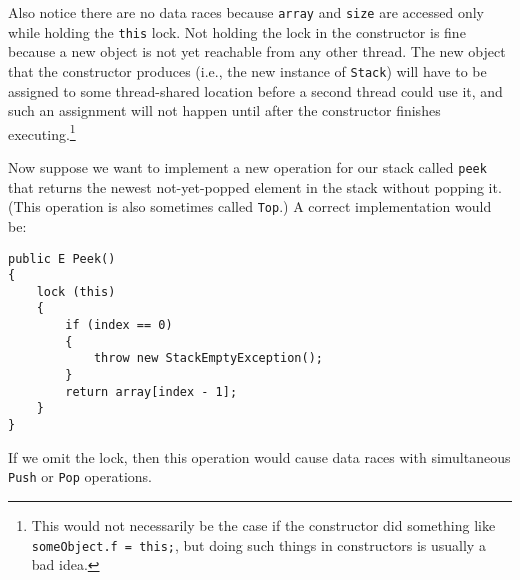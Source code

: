 \documentclass[10pt]{article}
\begin{document}
Also notice there are no data races because {\tt array} and {\tt size}
are accessed only while holding the {\tt this} lock.  Not holding the
lock in the constructor is fine because a new object is not yet
reachable from any other thread.  The new object that the constructor
produces (i.e., the new instance of {\tt Stack}) will
have to be assigned to some thread-shared location before a second
thread could use it, and such an assignment will not happen until
after the constructor finishes executing.\footnote{This would not
  necessarily be the case if the constructor did something like 
  {\tt someObject.f = this;}, but doing such things in constructors is
  usually a bad idea.}

Now suppose we want to implement a new operation for our stack called
{\tt peek} that returns the newest
not-yet-popped element in the stack without popping it.  (This
operation is also sometimes called {\tt Top}.) A correct
implementation would be:
\begin{verbatim}
public E Peek()
{
    lock (this)
    {
        if (index == 0)
        {
            throw new StackEmptyException();
        }
        return array[index - 1];
    }
}
\end{verbatim}
If we omit the lock, then this operation would
cause data races with simultaneous {\tt Push} or {\tt Pop} operations.
\end{document}
